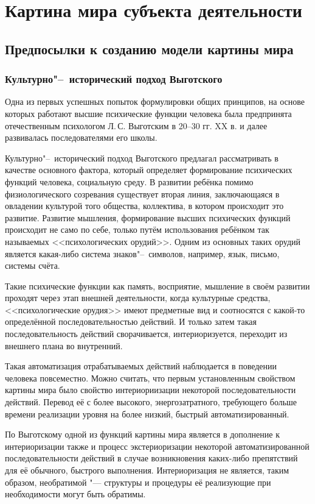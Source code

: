 \chapter{Картина мира субъекта деятельности} \label{chapt1}

\section{Предпосылки к созданию модели картины мира} \label{sect1_1}

\subsection{Культурно"--~исторический подход Выготского}

Одна из первых успешных попыток формулировки общих принципов, на основе которых работают высшие психические функции человека была предпринята отечественным психологом Л.\,С. Выготским в 20--30 гг. XX в. и далее развивалась последователями его школы. 

Культурно"--~исторический подход Выготского предлагал рассматривать в качестве основного фактора, который определяет формирование психических функций человека, социальную среду. В развитии ребёнка помимо физиологического созревания существует вторая линия, заключающаяся в овладении культурой того общества, коллектива, в котором происходит это развитие. Развитие мышления, формирование высших психических функций происходит не само по себе, только путём использования ребёнком так называемых <<психологических орудий>>. Одним из основных таких орудий является какая-либо система знаков"--~символов, например, язык, письмо, системы счёта.

Такие психические функции как память, восприятие, мышление в своём развитии проходят через этап внешней деятельности, когда культурные средства, <<психологические орудия>> имеют предметные вид и соотносятся с какой-то определённой последовательностью действий. И только затем такая последовательность действий сворачивается, интериоризуется, переходит из внешнего плана во внутренний. 

Такая автоматизация отрабатываемых действий наблюдается в поведении человека повсеместно. Можно считать, что первым установленным свойством картины мира было свойство интериориизации некоторой последовательности действий. Перевод её с более высокого, энергозатратного, требующего больше времени реализации уровня на более низкий, быстрый автоматизированный.

По Выготскому одной из функций картины мира является в дополнение к интериоризации также и процесс экстериоризации некоторой автоматизированной последовательности действий в случае возникновения каких-либо препятствий для её обычного, быстрого выполнения. Интериоризация не является, таким образом, необратимой "--- структуры и процедуры её реализующие при необходимости могут быть обратимы.


